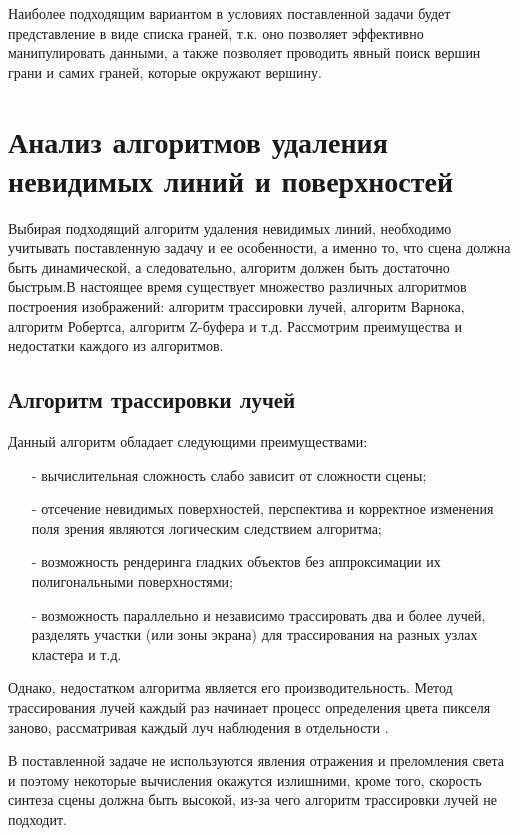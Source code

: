 Наиболее подходящим вариантом в условиях поставленной задачи будет представление в виде списка граней, т.к. оно позволяет эффективно манипулировать данными, а также позволяет проводить явный поиск вершин грани и самих граней, которые окружают вершину.

\section{Анализ алгоритмов удаления невидимых линий и поверхностей}

Выбирая подходящий алгоритм удаления невидимых линий, необходимо учитывать поставленную задачу и ее особенности, а именно то, что сцена должна быть динамической, а следовательно, алгоритм должен быть достаточно быстрым.В настоящее время существует множество различных алгоритмов построения изображений: алгоритм трассировки лучей, алгоритм Варнока, алгоритм Робертса, алгоритм Z-буфера и т.д. Рассмотрим преимущества и недостатки каждого из алгоритмов.

\subsection{Алгоритм трассировки лучей}

Данный алгоритм обладает следующими преимуществами:
\begin{itemize}
	\item[-] вычислительная сложность слабо зависит от сложности сцены;
	\item[-] отсечение невидимых поверхностей, перспектива и корректное изменения поля зрения являются логическим следствием алгоритма;
	\item[-] возможность рендеринга гладких объектов без аппроксимации их полигональными поверхностями;
	\item[-] возможность параллельно и независимо трассировать два и более лучей, разделять участки (или зоны экрана) для трассирования на разных узлах кластера и т.д.
\end{itemize}

Однако, недостатком алгоритма является его производительность. Метод трассирования лучей каждый раз начинает процесс определения цвета пикселя заново, рассматривая каждый луч наблюдения в отдельности \cite{raytrace}.

В поставленной задаче не используются явления отражения и преломления света и поэтому некоторые вычисления окажутся излишними, кроме того, скорость синтеза сцены должна быть высокой, из-за чего алгоритм трассировки лучей не подходит.

